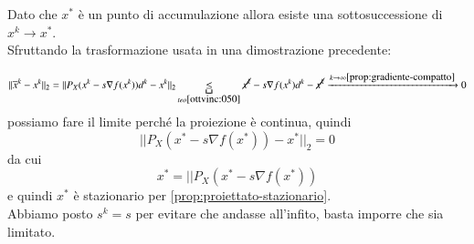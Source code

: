 \begin{thproof}
Dato che $x^{*}$ è un punto di accumulazione allora esiste una
sottosuccessione di $x^k \rightarrow x^{*}$.\\
Sfruttando la trasformazione usata in una dimostrazione precedente:

$$ || \overline{x}^k - x^k ||_2 = 
|| P_X (x^k - s \nabla f(x^k)) d^k - x^k ||_2 \underbracket{\leq}_{teo \ref{ottvinc:050}}
\cancel{x^k} - s \nabla f(x^k) d^k - \cancel{x^k} 
\xrightarrow{k \to \infty \ref{prop:gradiente-compatto}} 0 $$ 
possiamo fare il limite perché la proiezione è continua, quindi
$$ || P_X (x^{*} - s \nabla f(x^{*})) - x^{*} ||_2 = 0 $$ 
da cui 
$$ x^{*} = || P_X (x^{*} - s \nabla f(x^{*})) $$
e quindi $x^{*}$ è stazionario per \ref{prop:proiettato-stazionario}.\\

Abbiamo posto $s^k=s$ per evitare che andasse all'infito, basta
imporre che sia limitato.


\end{thproof}

\begin{center}
\end{center}


